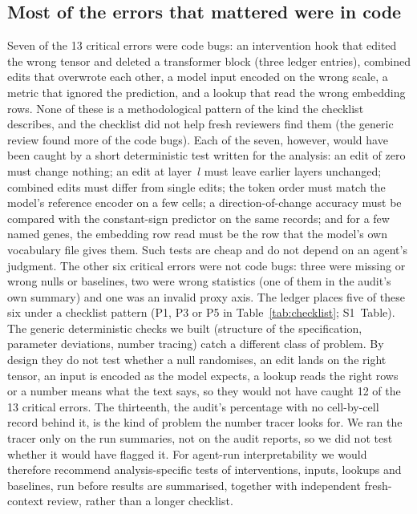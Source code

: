 \subsection*{Most of the errors that mattered were in code}
Seven of the 13 critical errors were code bugs: an intervention hook that
edited the wrong tensor and deleted a transformer block (three ledger
entries), combined edits that overwrote each other, a model input encoded
on the wrong scale, a metric that ignored the prediction, and a lookup
that read the wrong embedding rows. None of these is a methodological
pattern of the kind the checklist describes, and the checklist did not
help fresh reviewers find them (the generic review found more of the code
bugs). Each of the seven, however, would have been caught by a short
deterministic test written for the analysis: an edit of zero must change
nothing; an edit at layer~$l$ must leave earlier layers unchanged;
combined edits must differ from single edits; the token order must match
the model's reference encoder on a few cells; a direction-of-change
accuracy must be compared with the constant-sign predictor on the same
records; and for a few named genes, the embedding row read must be the
row that the model's own vocabulary file gives them. Such tests are cheap
and do not depend on an agent's judgment. The other six critical errors
were not code bugs: three were missing or wrong nulls or baselines, two
were wrong statistics (one of them in the audit's own summary) and one
was an invalid proxy axis. The ledger places five of these six under a
checklist pattern (P1, P3 or P5 in Table~\ref{tab:checklist}; S1~Table).
The generic deterministic checks we built (structure of the
specification, parameter deviations, number tracing) catch a different
class of problem. By design they do not test whether a null randomises,
an edit lands on the right tensor, an input is encoded as the model
expects, a lookup reads the right rows or a number means what the text
says, so they would not have caught 12 of the 13 critical errors. The thirteenth, the audit's percentage with
no cell-by-cell record behind it, is the kind of problem the number
tracer looks for. We ran the tracer only on the run summaries, not on the
audit reports, so we did not test whether it would have flagged it. For
agent-run interpretability we would therefore recommend
analysis-specific tests of interventions, inputs, lookups and baselines,
run before results are summarised, together with independent
fresh-context review, rather than a longer checklist.

